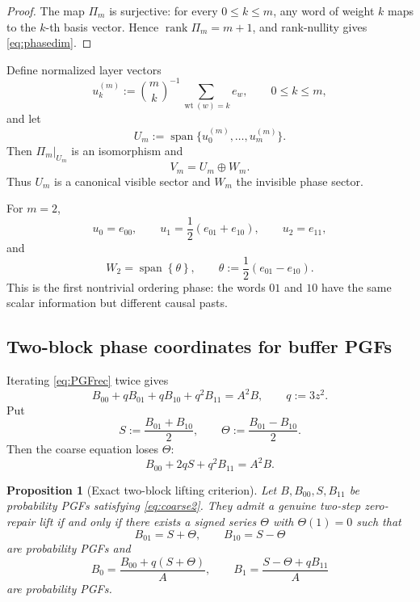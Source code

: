 \documentclass[11pt,a4paper]{article}
\newtheorem{proposition}[theorem]{Proposition}
\theoremstyle{definition}
\theoremstyle{remark}
\newcommand{\Span}{\operatorname{span}}
\newcommand{\wt}{\operatorname{wt}}
\begin{document}
\begin{proof}
The map \(\Pi_m\) is surjective: for every \(0\le k\le m\), any word of
weight \(k\) maps to the \(k\)-th basis vector.  Hence
\(\operatorname{rank}\Pi_m=m+1\), and rank-nullity gives
\eqref{eq:phasedim}.
\end{proof}

Define normalized layer vectors
\[
 u_k^{(m)}:=\binom{m}{k}^{-1}\sum_{\wt(w)=k}e_w,
 \qquad 0\le k\le m,
\]
and let
\[
 U_m:=\Span\{u_0^{(m)},\ldots,u_m^{(m)}\}.
\]
Then \(\Pi_m|_{U_m}\) is an isomorphism and
\begin{equation}
 V_m=U_m\oplus W_m.
 \label{eq:UW}
\end{equation}
Thus \(U_m\) is a canonical visible sector and \(W_m\) the invisible phase
sector.

For \(m=2\),
\[
 u_0=e_{00},
 \qquad
 u_1=\frac12(e_{01}+e_{10}),
 \qquad
 u_2=e_{11},
\]
and
\begin{equation}
 W_2=\Span\left\{\theta\right\},
 \qquad
 \theta:=\frac12(e_{01}-e_{10}).
 \label{eq:theta2}
\end{equation}
This is the first nontrivial ordering phase: the words \(01\) and \(10\) have
the same scalar information but different causal pasts.

\subsection{Two-block phase coordinates for buffer PGFs}

Iterating \eqref{eq:PGFrec} twice gives
\begin{equation}
 \boxed{
 B_{00}+qB_{01}+qB_{10}+q^2B_{11}=A^2B,
 \qquad q:=3z^2.
 }
 \label{eq:2block}
\end{equation}
Put
\begin{equation}
 S:=\frac{B_{01}+B_{10}}2,
 \qquad
 \Theta:=\frac{B_{01}-B_{10}}2.
 \label{eq:Stheta}
\end{equation}
Then the coarse equation loses \(\Theta\):
\begin{equation}
 \boxed{B_{00}+2qS+q^2B_{11}=A^2B.}
 \label{eq:coarse2}
\end{equation}

\begin{proposition}[Exact two-block lifting criterion]
\label{prop:lift}
Let \(B,B_{00},S,B_{11}\) be probability PGFs satisfying
\eqref{eq:coarse2}.  They admit a genuine two-step zero-repair lift if and
only if there exists a signed series \(\Theta\) with \(\Theta(1)=0\) such that
\[
 B_{01}=S+\Theta,
 \qquad
 B_{10}=S-\Theta
\]
are probability PGFs and
\begin{equation}
 \boxed{
 B_0=\frac{B_{00}+q(S+\Theta)}{A},
 \qquad
 B_1=\frac{S-\Theta+qB_{11}}{A}
 }
 \label{eq:phaseLift}
\end{equation}
are probability PGFs.
\end{proposition}
\end{document}
